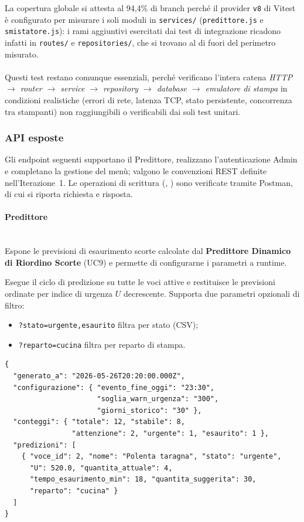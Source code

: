 La copertura globale si attesta al 94{,}4\% di branch perché il provider \texttt{v8} di Vitest è configurato per misurare i soli moduli in \texttt{services/} (\texttt{predittore.js} e \texttt{smistatore.js}): i rami aggiuntivi esercitati dai test di integrazione ricadono infatti in \texttt{routes/} e \texttt{repositories/}, che si trovano al di fuori del perimetro misurato.
\\ \\
Questi test restano comunque essenziali, perché verificano l'intera catena \emph{HTTP $\to$ router $\to$ service $\to$ repository $\to$ database $\to$ emulatore di stampa} in condizioni realistiche (errori di rete, latenza TCP, stato persistente, concorrenza tra stampanti) non raggiungibili o verificabili dai soli test unitari.

\subsubsection{API esposte}

Gli endpoint seguenti supportano il Predittore, realizzano l'autenticazione Admin
e completano la gestione del menù; valgono le convenzioni REST definite
nell'Iterazione~1. Le operazioni di
scrittura (\POST, \PUT) sono verificate tramite Postman, di cui si riporta
richiesta e risposta.

\paragraph{Predittore}\mbox{}\\

Espone le previsioni di esaurimento scorte calcolate dal \textbf{Predittore
Dinamico di Riordino Scorte} (UC9) e permette di configurarne i parametri
a runtime.


Esegue il ciclo di predizione su tutte le voci attive e restituisce le
previsioni ordinate per indice di urgenza $U$ decrescente. Supporta due
parametri opzionali di filtro:
\begin{itemize}
  \item \texttt{?stato=urgente,esaurito}  filtra per stato (CSV);
  \item \texttt{?reparto=cucina}  filtra per reparto di stampa.
\end{itemize}

\begin{lstlisting}[style=json]
{
  "generato_a": "2026-05-26T20:20:00.000Z",
  "configurazione": { "evento_fine_oggi": "23:30",
                      "soglia_warn_urgenza": "300",
                      "giorni_storico": "30" },
  "conteggi": { "totale": 12, "stabile": 8,
                "attenzione": 2, "urgente": 1, "esaurito": 1 },
  "predizioni": [
    { "voce_id": 2, "nome": "Polenta taragna", "stato": "urgente",
      "U": 520.0, "quantita_attuale": 4,
      "tempo_esaurimento_min": 18, "quantita_suggerita": 30,
      "reparto": "cucina" }
  ]
}
\end{lstlisting}


